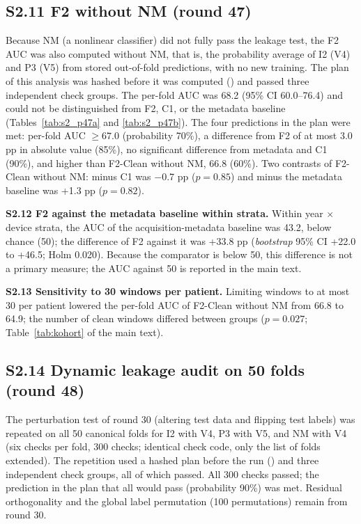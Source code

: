 \subsection*{S2.11 F2 without NM (round 47)}
Because NM (a nonlinear classifier) did not fully pass the leakage test, the F2 AUC was also computed without NM, that is, the probability average of I2 (V4) and P3 (V5) from stored out-of-fold predictions, with no new training. The plan of this analysis was hashed before it was computed () and passed three independent check groups. The per-fold AUC was 68.2 (95\% CI 60.0--76.4) and could not be distinguished from F2, C1, or the metadata baseline (Tables~\ref{tab:s2_p47a} and \ref{tab:s2_p47b}). The four predictions in the plan were met: per-fold AUC $\geq 67.0$ (probability 70\%), a difference from F2 of at most 3.0 pp in absolute value (85\%), no significant difference from metadata and C1 (90\%), and higher than F2-Clean without NM, 66.8 (60\%). Two contrasts of F2-Clean without NM: minus C1 was $-$0.7 pp ($p = 0.85$) and minus the metadata baseline was +1.3 pp ($p = 0.82$).


\textbf{S2.12 F2 against the metadata baseline within strata.} Within year $\times$ device strata, the AUC of the acquisition-metadata baseline was 43.2, below chance (50); the difference of F2 against it was +33.8 pp (\textit{bootstrap} 95\% CI +22.0 to +46.5; Holm 0.020). Because the comparator is below 50, this difference is not a primary measure; the AUC against 50 is reported in the main text.

\textbf{S2.13 Sensitivity to 30 windows per patient.} Limiting windows to at most 30 per patient lowered the per-fold AUC of F2-Clean without NM from 66.8 to 64.9; the number of clean windows differed between groups ($p = 0.027$; Table~\ref{tab:kohort} of the main text).

\subsection*{S2.14 Dynamic leakage audit on 50 folds (round 48)}
The perturbation test of round 30 (altering test data and flipping test labels) was repeated on all 50 canonical folds for I2 with V4, P3 with V5, and NM with V4 (six checks per fold, 300 checks; identical check code, only the list of folds extended). The repetition used a hashed plan before the run () and three independent check groups, all of which passed. All 300 checks passed; the prediction in the plan that all would pass (probability 90\%) was met. Residual orthogonality and the global label permutation (100 permutations) remain from round 30.




